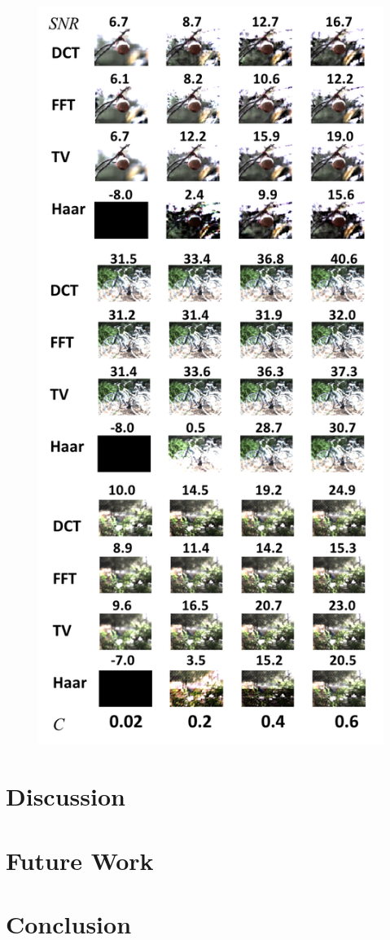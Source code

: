 \documentclass[10pt,twocolumn,letterpaper]{article}
\begin{document}
\begin{figure}[t]
\begin{center}
 \includegraphics[width=0.95\linewidth]{img/example_images.png}
\end{center}
   \caption{}
\end{figure}

\section{Discussion}

\section{Future Work}

\section{Conclusion}



{\small


}
\end{document}
